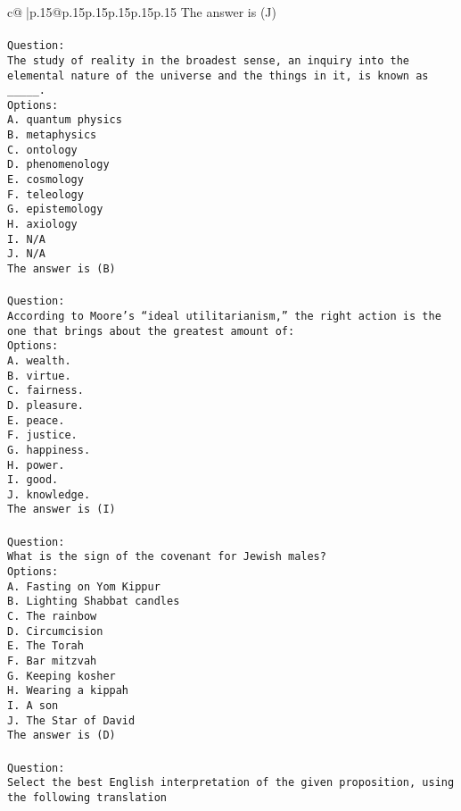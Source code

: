 \documentclass{article}
\begin{document}
{\begin{supertabular}{c@{$\;$}|p{.15\linewidth}@{}p{.15\linewidth}p{.15\linewidth}p{.15\linewidth}p{.15\linewidth}p{.15\linewidth}}
{{{The answer is (J)\\ \tt \\ \tt Question:\\ \tt The study of reality in the broadest sense, an inquiry into the elemental nature of the universe and the things in it, is known as _____.\\ \tt Options:\\ \tt A. quantum physics\\ \tt B. metaphysics\\ \tt C. ontology\\ \tt D. phenomenology\\ \tt E. cosmology\\ \tt F. teleology\\ \tt G. epistemology\\ \tt H. axiology\\ \tt I. N/A\\ \tt J. N/A\\ \tt The answer is (B)\\ \tt \\ \tt Question:\\ \tt According to Moore’s “ideal utilitarianism,” the right action is the one that brings about the greatest amount of:\\ \tt Options:\\ \tt A. wealth.\\ \tt B. virtue.\\ \tt C. fairness.\\ \tt D. pleasure.\\ \tt E. peace.\\ \tt F. justice.\\ \tt G. happiness.\\ \tt H. power.\\ \tt I. good.\\ \tt J. knowledge.\\ \tt The answer is (I)\\ \tt \\ \tt Question:\\ \tt What is the sign of the covenant for Jewish males?\\ \tt Options:\\ \tt A. Fasting on Yom Kippur\\ \tt B. Lighting Shabbat candles\\ \tt C. The rainbow\\ \tt D. Circumcision\\ \tt E. The Torah\\ \tt F. Bar mitzvah\\ \tt G. Keeping kosher\\ \tt H. Wearing a kippah\\ \tt I. A son\\ \tt J. The Star of David\\ \tt The answer is (D)\\ \tt \\ \tt Question:\\ \tt  Select the best English interpretation of the given proposition, using the following translation }}}
\end{supertabular}}
\end{document}
